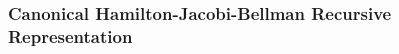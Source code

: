 \documentclass[12pt]{book}
\numberwithin{equation}{section} %
\theoremstyle{plain}
\theoremstyle{definition}
\theoremstyle{remark}
\begin{document}


\clearpage
\subsubsection{Canonical Hamilton-Jacobi-Bellman Recursive
Representation}
\end{document}
